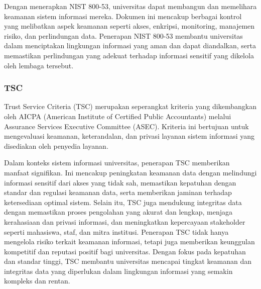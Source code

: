 \documentclass[12pt]{article}
\begin{document}
Dengan menerapkan NIST 800-53, universitas dapat membangun dan memelihara keamanan sistem informasi mereka. Dokumen ini mencakup berbagai kontrol yang melibatkan aspek keamanan seperti akses, enkripsi, monitoring, manajemen risiko, dan perlindungan data. Penerapan NIST 800-53 membantu universitas dalam menciptakan lingkungan informasi yang aman dan dapat diandalkan, serta memastikan perlindungan yang adekuat terhadap informasi sensitif yang dikelola oleh lembaga tersebut.
\subsubsection*{TSC}
Trust Service Criteria (TSC) merupakan seperangkat kriteria yang dikembangkan oleh AICPA (American Institute of Certified Public Accountants) melalui Assurance Services Executive Committee (ASEC). Kriteria ini bertujuan untuk mengevaluasi keamanan, keterandalan, dan privasi layanan sistem informasi yang disediakan oleh penyedia layanan. 

Dalam konteks sistem informasi universitas, penerapan TSC memberikan manfaat signifikan. Ini mencakup peningkatan keamanan data dengan melindungi informasi sensitif dari akses yang tidak sah, memastikan kepatuhan dengan standar dan regulasi keamanan data, serta memberikan jaminan terhadap ketersediaan optimal sistem. Selain itu, TSC juga mendukung integritas data dengan memastikan proses pengolahan yang akurat dan lengkap, menjaga kerahasiaan dan privasi informasi, dan meningkatkan kepercayaan stakeholder seperti mahasiswa, staf, dan mitra institusi. Penerapan TSC tidak hanya mengelola risiko terkait keamanan informasi, tetapi juga memberikan keunggulan kompetitif dan reputasi positif bagi universitas. Dengan fokus pada kepatuhan dan standar tinggi, TSC membantu universitas mencapai tingkat keamanan dan integritas data yang diperlukan dalam lingkungan informasi yang semakin kompleks dan rentan.


\printbibliography[title=Daftar Pustaka]
\end{document}
